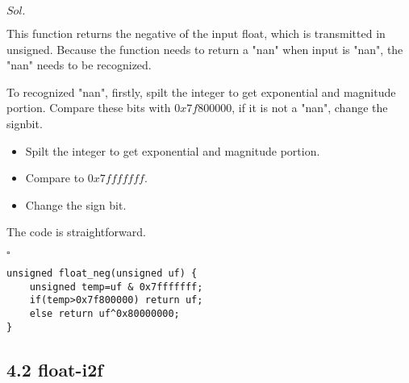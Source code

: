 \documentclass[a4paper, 11pt]{article}
\newenvironment{sol}[1] {\par \noindent $#1.$} {\par \hfill $\square$}
\begin{document}
\begin{sol}{Sol}

This function returns the negative of the input float, which is transmitted in unsigned. Because the function needs to return a "nan" when input is "nan", the "nan" needs to be recognized.

To recognized "nan", firstly, spilt the integer to get exponential and magnitude portion. Compare these bits with $0x7f800000$, if it is not a "nan", change the signbit.

\begin{itemize}
    \item Spilt the integer to get exponential and magnitude portion.
    \item Compare to $0x7fffffff$.
    \item Change the sign bit.
\end{itemize}

The code is straightforward.
\end{sol}
\begin{lstlisting}
unsigned float_neg(unsigned uf) {
    unsigned temp=uf & 0x7fffffff;
    if(temp>0x7f800000) return uf;
    else return uf^0x80000000;
}

\end{lstlisting}

\subsection*{4.2 float-i2f}
\end{document}
